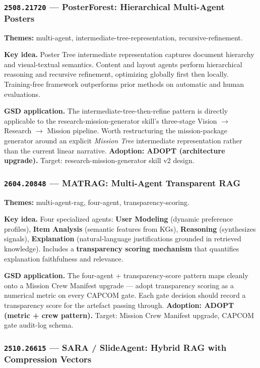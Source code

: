 \documentclass[11pt,letterpaper]{article}
\newcommand{\arxivid}[1]{\texttt{\textcolor{accent}{#1}}}
\newcommand{\paperhead}[2]{\noindent\textbf{\sffamily\textcolor{secondary}{#1}} \textemdash{} #2}
\begin{document}
\subsubsection{\arxivid{2508.21720} --- PosterForest: Hierarchical Multi-Agent Posters}

\paperhead{Themes:}{multi-agent, intermediate-tree-representation, recursive-refinement.}

\textbf{Key idea.} Poster Tree intermediate representation captures document hierarchy and visual-textual semantics. Content and layout agents perform hierarchical reasoning and recursive refinement, optimizing globally first then locally. Training-free framework outperforms prior methods on automatic and human evaluations.

\textbf{GSD application.} The intermediate-tree-then-refine pattern is directly applicable to the research-mission-generator skill's three-stage Vision $\to$ Research $\to$ Mission pipeline. Worth restructuring the mission-package generator around an explicit \textit{Mission Tree} intermediate representation rather than the current linear narrative. \textbf{Adoption: ADOPT (architecture upgrade).} Target: research-mission-generator skill v2 design.

\subsubsection{\arxivid{2604.20848} --- MATRAG: Multi-Agent Transparent RAG}

\paperhead{Themes:}{multi-agent-rag, four-agent, transparency-scoring.}

\textbf{Key idea.} Four specialized agents: \textbf{User Modeling} (dynamic preference profiles), \textbf{Item Analysis} (semantic features from KGs), \textbf{Reasoning} (synthesizes signals), \textbf{Explanation} (natural-language justifications grounded in retrieved knowledge). Includes a \textbf{transparency scoring mechanism} that quantifies explanation faithfulness and relevance.

\textbf{GSD application.} The four-agent + transparency-score pattern maps cleanly onto a Mission Crew Manifest upgrade --- adopt transparency scoring as a numerical metric on every CAPCOM gate. Each gate decision should record a transparency score for the artefact passing through. \textbf{Adoption: ADOPT (metric + crew pattern).} Target: Mission Crew Manifest upgrade, CAPCOM gate audit-log schema.

\subsubsection{\arxivid{2510.26615} --- SARA / SlideAgent: Hybrid RAG with Compression Vectors}
\end{document}
